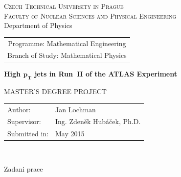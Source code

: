 \documentclass[a4paper,11pt,twoside,openright]{book}
\newcommand{\cvut}{Czech Technical University in Prague}
\newcommand{\fjfi}{Faculty of Nuclear Sciences and Physical Engineering}
\newcommand{\km}{Department of Physics}
\newcommand{\obor}{Mathematical Engineering}
\newcommand{\zamereni}{Mathematical Physics}
\newcommand{\nazeven}{High $\mathbf{\pt}$ jets in Run~II of the ATLAS Experiment}
\newcommand{\autor}{Jan Lochman}
\newcommand{\rok}{May 2015}
\newcommand{\vedouci}{Ing. Zden\v{e}k Hub\'{a}\v{c}ek, Ph.D.}
\newcommand{\pt}{p_{T}}
\begin{document}
\thispagestyle{empty}

\begin{center}
    {\Large \textsc{\cvut}\\[1.5ex] \textsc{\fjfi}}\\[1.5ex]{\large \textsc \km}
    \vspace{10mm}

    \begin{tabular}{c}
    {Programme: \obor}\\
    {Branch of Study: \zamereni}
    \end{tabular}

    \vspace{10mm} \epsfysize=25mm  \epsfysize=25mm  \vspace{15mm}

   {\huge \bf \nazeven}

   \vspace{15mm}
   {\Large MASTER'S DEGREE PROJECT}

   \vfill
   {\large
    \begin{tabular}{ll}
    Author: & \autor\\
    Supervisor: & \vedouci\\
    Submitted in: & \rok
    \end{tabular}
   }
\end{center}


\newpage  
\thispagestyle{empty} 
~


\newpage  
\thispagestyle{empty} 
Zadani prace


\newpage  
\thispagestyle{empty} 
~


\newpage 
\thispagestyle{empty}  
~
\vfill 
\end{document}
